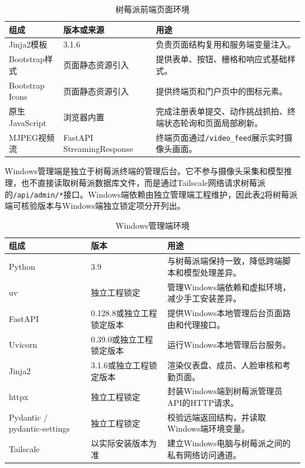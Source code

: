 \begin{table}[H]
    \centering
    \caption{树莓派前端页面环境}
    \label{tab:pi_frontend_env}
    \begin{tabularx}{\textwidth}{p{3.5cm}p{3cm}X}
        \toprule
        \textbf{组成} & \textbf{版本或来源} & \textbf{用途} \\
        \midrule
        Jinja2模板 & 3.1.6 & 负责页面结构复用和服务端变量注入。 \\
        Bootstrap样式 & 页面静态资源引入 & 提供表单、按钮、栅格和响应式基础样式。 \\
        Bootstrap Icons & 页面静态资源引入 & 提供终端页和门户页中的图标元素。 \\
        原生JavaScript & 浏览器内置 & 完成注册表单提交、动作挑战抓拍、终端状态轮询和页面局部刷新。 \\
        MJPEG视频流 & FastAPI StreamingResponse & 终端页面通过\texttt{/video\_feed}展示实时摄像头画面。 \\
        \bottomrule
    \end{tabularx}
\end{table}

Windows管理端是独立于树莓派终端的管理后台。它不参与摄像头采集和模型推理，也不直接读取树莓派数据库文件，而是通过Tailscale网络请求树莓派的\texttt{/api/admin/*}接口。Windows端依赖由独立管理端工程维护，因此表\ref{tab:windows_env}将树莓派端可核验版本与Windows端独立锁定项分开列出。

\begin{table}[H]
    \centering
    \caption{Windows管理端环境}
    \label{tab:windows_env}
    \begin{tabularx}{\textwidth}{p{3.5cm}p{3.2cm}X}
        \toprule
        \textbf{组成} & \textbf{版本} & \textbf{用途} \\
        \midrule
        Python & 3.9 & 与树莓派端保持一致，降低跨端脚本和模型处理差异。 \\
        uv & 独立工程锁定 & 管理Windows端依赖和虚拟环境，减少手工安装差异。 \\
        FastAPI & 0.128.8或独立工程锁定版本 & 提供Windows本地管理后台页面路由和代理接口。 \\
        Uvicorn & 0.39.0或独立工程锁定版本 & 运行Windows本地管理后台服务。 \\
        Jinja2 & 3.1.6或独立工程锁定版本 & 渲染仪表盘、成员、人脸审核和考勤页面。 \\
        httpx & 独立工程锁定 & 封装Windows端到树莓派管理员API的HTTP请求。 \\
        Pydantic / pydantic-settings & 独立工程锁定 & 校验远端返回结构，并读取Windows端环境变量。 \\
        Tailscale & 以实际安装版本为准 & 建立Windows电脑与树莓派之间的私有网络访问通道。 \\
        \bottomrule
    \end{tabularx}
\end{table}

